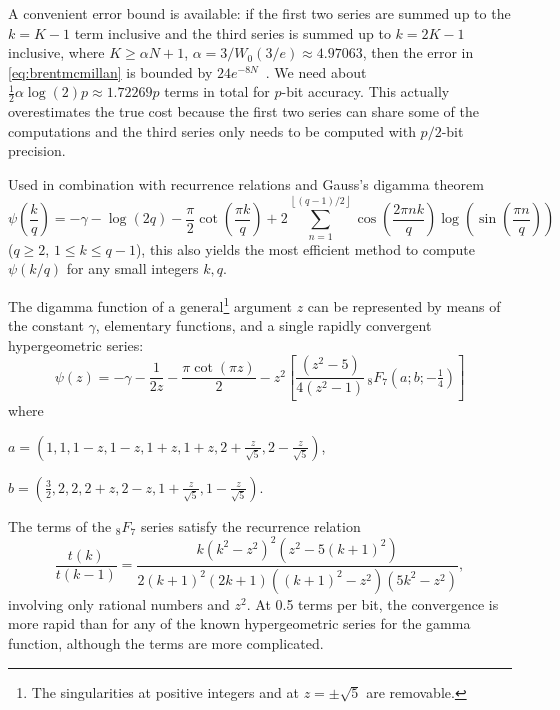 \documentclass[reqno]{amsart}
\theoremstyle{definition}
\begin{document}
A convenient error bound is available: if the first two series are summed up to the $k = K-1$ term
inclusive and the third series is summed up to $k = 2K-1$ inclusive,
where $K \ge \alpha N + 1$, $\alpha = 3 / W_0(3/e) \approx 4.97063$,
then the error in \eqref{eq:brentmcmillan} is bounded by $24 e^{-8N}$~\cite{BrentJohansson2013bound}.
We need about $\tfrac{1}{2} \alpha \log(2) p \approx 1.72269 p$ terms in total for $p$-bit accuracy.
This actually overestimates the true cost
because the first two series can share some of the
computations and the third series only needs to be computed with $p/2$-bit precision.

Used in combination with recurrence relations and Gauss's digamma theorem
\begin{equation}
\psi\!\left(\frac{k}{q}\right) = -\gamma - \log\!\left(2 q\right) - \frac{\pi}{2} \cot\!\left(\frac{\pi k}{q}\right) + 2 \sum_{n=1}^{\left\lfloor \left( q - 1 \right) / 2 \right\rfloor} \cos\!\left(\frac{2 \pi n k}{q}\right) \log\!\left(\sin\!\left(\frac{\pi n}{q}\right)\right)
\end{equation}
($q \ge 2$, $1 \le k \le q - 1$),
this also yields the most efficient method to
compute $\psi(k/q)$ for any small integers $k, q$.

The digamma function of a general\footnote{The singularities at positive integers and at $z = \pm \sqrt{5}$ are removable.} argument $z$ can be represented
by means of the constant $\gamma$, elementary functions, and a single rapidly convergent hypergeometric series:
\begin{equation}
\psi(z) = -\gamma - \frac{1}{2z} - \frac{\pi \cot(\pi z)}{2} - z^2 \left[ \frac{(z^2-5)}{4 (z^2-1)} \, {}_8F_7 ( a; b; -\tfrac{1}{4} ) \right]
\label{eq:zetagen1}
\end{equation}
where
\begin{center}
$a = (1, 1, 1-z, 1-z, 1+z, 1+z, 2+\tfrac{z}{\sqrt{5}}, 2-\tfrac{z}{\sqrt{5}})$,

$b = (\tfrac{3}{2}, 2, 2, 2+z, 2-z, 1+\tfrac{z}{\sqrt{5}}, 1-\tfrac{z}{\sqrt{5}})$.
\end{center}

The terms of the ${}_8F_7$ series satisfy the recurrence relation
\begin{equation}
\frac{t(k)}{t(k-1)} = \frac{k (k^2 - z^2)^2 (z^2 - 5 (k+1)^2)}{2(k+1)^2 (2k+1) ((k+1)^2-z^2) (5k^2-z^2)},
\end{equation}
involving only rational numbers and $z^2$.
At 0.5 terms per bit, the convergence is more rapid than for any
of the known hypergeometric series for the gamma function,
although the terms are more complicated.
\end{document}
